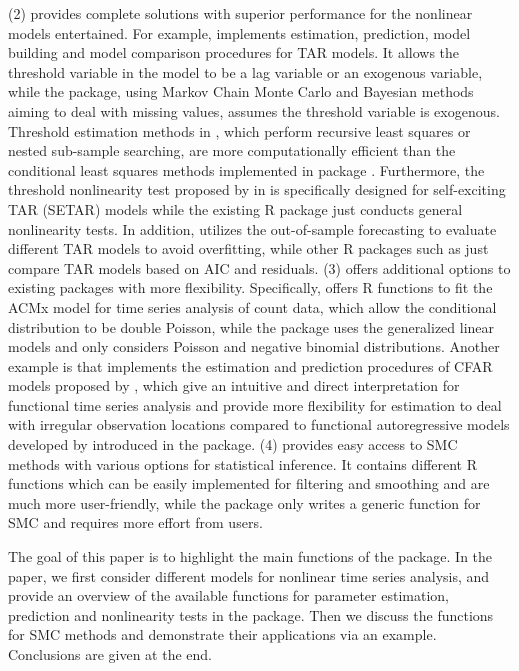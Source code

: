 (2)  provides complete solutions with superior performance for the nonlinear models entertained. For example,  implements estimation, prediction, model building and model comparison procedures for TAR models. It allows the threshold variable in the model to be a lag variable or an exogenous variable, while the  \citep{RTAR} package, using Markov Chain Monte Carlo and Bayesian methods aiming to deal with missing values, assumes the threshold variable is exogenous. Threshold estimation methods in , which perform recursive least squares or nested sub-sample searching, are more computationally efficient than the conditional least squares methods implemented in package  \citep{RtsDyn}. Furthermore, the threshold nonlinearity test proposed by \citet{tsay1989} in  is specifically designed for self-exciting TAR (SETAR) models while the existing R package  just conducts general nonlinearity tests. In addition,  utilizes the out-of-sample forecasting to evaluate different TAR models to avoid overfitting, while other R packages such as  just compare TAR models based on AIC and residuals. (3)  offers additional options to existing packages with more flexibility. Specifically,  offers R functions to fit the ACMx model for time series analysis of count data, which allow the conditional distribution to be double Poisson, while the  \citep{Rtscount} package uses the generalized linear models and only considers Poisson and negative binomial distributions. Another example is that  implements the estimation and prediction procedures of CFAR models proposed by \citet{liu2016functional}, which give an intuitive and direct interpretation for functional time series analysis and provide more flexibility for estimation to deal with irregular observation locations compared to functional autoregressive models developed by \citet{bosq2000} introduced in the  \citep{Rftsa} package. (4)  provides easy access to SMC methods with various options for statistical inference. It contains different R functions which can be easily implemented for filtering and smoothing and are much more user-friendly, while the  \citep{RSMC} package only writes a generic function for SMC and requires more effort from users.

The goal of this paper is to highlight the main functions of the  package. In the paper, we first consider different models for nonlinear time series analysis, and provide an overview of the available functions for parameter estimation, prediction and nonlinearity tests in the  package. Then we discuss the functions for SMC methods and demonstrate their applications via an example. Conclusions are given at the end. 


